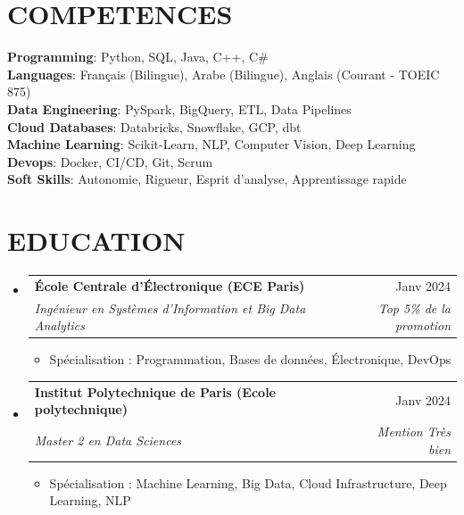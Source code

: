 \documentclass[11pt,a4paper]{article}
\makeatletter
\newcommand{\resumeItem}[1]{
  \item\small{
    {#1 \vspace{-1pt}}
  }
}
\newcommand{\resumeSubheading}[4]{
  \vspace{-1pt}\item
    \begin{tabular*}{\textwidth}[t]{l@{\extracolsep{\fill}}r}
      \textbf{#1} & #2 \\
      \textit{#3} & \textit{#4} \\
    \end{tabular*}\vspace{-4pt}
}
\newcommand{\resumeSubHeadingListStart}{\begin{itemize}[leftmargin=0in, label={}]}
\newcommand{\resumeSubHeadingListEnd}{\end{itemize}}
\newcommand{\resumeItemListStart}{\begin{itemize}[label={\textbullet}]}
\newcommand{\resumeItemListEnd}{\end{itemize}\vspace{0pt}}
\makeatother
\begin{document}
\section{COMPETENCES}
\begin{itemize}[leftmargin=0in, label={}]
\small{\item{
\textbf{Programming}: Python, SQL, Java, C++, C{\#} \\
\vspace{1pt}
\textbf{Languages}: Français (Bilingue), Arabe (Bilingue), Anglais (Courant - TOEIC 875) \\
\vspace{1pt}
\textbf{Data Engineering}: PySpark, BigQuery, ETL, Data Pipelines \\
\vspace{1pt}
\textbf{Cloud Databases}: Databricks, Snowflake, GCP, dbt \\
\vspace{1pt}
\textbf{Machine Learning}: Scikit-Learn, NLP, Computer Vision, Deep Learning \\
\vspace{1pt}
\textbf{Devops}: Docker, CI/CD, Git, Scrum \\
\vspace{1pt}
\textbf{Soft Skills}: Autonomie, Rigueur, Esprit d'analyse, Apprentissage rapide
}
}
\end{itemize}

\section{EDUCATION}
\resumeSubHeadingListStart
    \resumeSubheading
      {École Centrale d'Électronique (ECE Paris)}
      {Janv 2024}
      {Ingénieur en Systèmes d'Information et Big Data Analytics}
      {Top 5\% de la promotion}
      \resumeItemListStart
        \resumeItem{Spécialisation : Programmation, Bases de données, Électronique, DevOps}
      \resumeItemListEnd
    \resumeSubheading
      {Institut Polytechnique de Paris (Ecole polytechnique)}
      {Janv 2024}
      {Master 2 en Data Sciences}
      {Mention Très bien}
      \resumeItemListStart
        \resumeItem{Spécialisation : Machine Learning, Big Data, Cloud Infrastructure, Deep Learning, NLP}
      \resumeItemListEnd
  \resumeSubHeadingListEnd
\end{document}
